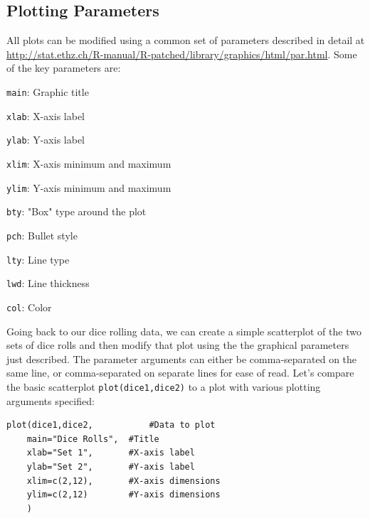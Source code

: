 \documentclass[12pt]{article}\usepackage[]{graphicx}\usepackage[]{color}
\begin{document}
\subsection{Plotting Parameters}
All plots can be modified using a common set of parameters described in detail at \url{http://stat.ethz.ch/R-manual/R-patched/library/graphics/html/par.html}. Some of the key parameters are:
\begin{itemize*}
\item \verb|main|: Graphic title
\item \verb|xlab|: X-axis label
\item \verb|ylab|: Y-axis label
\item \verb|xlim|: X-axis minimum and maximum
\item \verb|ylim|: Y-axis minimum and maximum
\item \verb|bty|: "Box" type around the plot
\item \verb|pch|: Bullet style
\item \verb|lty|: Line type
\item \verb|lwd|: Line thickness
\item \verb|col|: Color
\end{itemize*}

Going back to our dice rolling data, we can create a simple scatterplot of the two sets of dice rolls and then modify that plot using the the graphical parameters just described. The parameter arguments can either be comma-separated on the same line, or comma-separated on separate lines for ease of read. Let's compare the basic scatterplot \verb|plot(dice1,dice2)| to a plot with various plotting arguments specified:
\begin{verbatim}
plot(dice1,dice2,			#Data to plot
	main="Dice Rolls",	#Title
	xlab="Set 1",		#X-axis label
	ylab="Set 2",		#Y-axis label
	xlim=c(2,12),		#X-axis dimensions
	ylim=c(2,12)		#Y-axis dimensions
	)
\end{verbatim}
\end{document}
